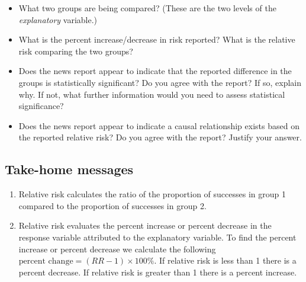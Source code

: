 \documentclass[
]{report}
\providecommand{\tightlist}{%
  \setlength{\itemsep}{0pt}\setlength{\parskip}{0pt}}
\begin{document}
\vspace{0.5in}

\begin{itemize}
\tightlist
\item
  What two groups are being compared? (These are the two levels of the \emph{explanatory} variable.)
\end{itemize}

\vspace{0.5in}

\begin{itemize}
\tightlist
\item
  What is the percent increase/decrease in risk reported? What is the relative risk comparing the two groups?
\end{itemize}

\vspace{0.5in}

\begin{itemize}
\tightlist
\item
  Does the news report appear to indicate that the reported difference in the groups is statistically significant? Do you agree with the report? If so, explain why. If not, what further information would you need to assess statistical significance?
\end{itemize}

\vspace{1in}

\begin{itemize}
\tightlist
\item
  Does the news report appear to indicate a causal relationship exists based on the reported relative risk? Do you agree with the report? Justify your answer.
\end{itemize}

\vspace{1in}
\newpage

\hypertarget{take-home-messages-23}{%
\subsection{Take-home messages}\label{take-home-messages-23}}

\begin{enumerate}
\def\labelenumi{\arabic{enumi}.}
\item
  Relative risk calculates the ratio of the proportion of successes in group 1 compared to the proportion of successes in group 2.
\item
  Relative risk evaluates the percent increase or percent decrease in the response variable attributed to the explanatory variable. To find the percent increase or percent decrease we calculate the following \(\text{percent change}=(RR - 1)\times 100\%\). If relative risk is less than 1 there is a percent decrease. If relative risk is greater than 1 there is a percent increase.
\end{enumerate}
\end{document}
